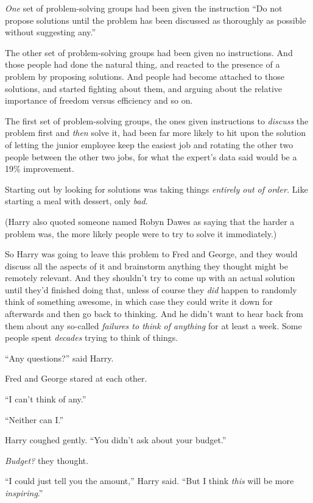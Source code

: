 \emph{One} set of problem-solving groups had been given the instruction “Do not propose solutions until the problem has been discussed as thoroughly as possible without suggesting any.”

The other set of problem-solving groups had been given no instructions. And those people had done the natural thing, and reacted to the presence of a problem by proposing solutions. And people had become attached to those solutions, and started fighting about them, and arguing about the relative importance of freedom versus efficiency and so on.

The first set of problem-solving groups, the ones given instructions to \emph{discuss} the problem first and \emph{then} solve it, had been far more likely to hit upon the solution of letting the junior employee keep the easiest job and rotating the other two people between the other two jobs, for what the expert’s data said would be a 19\% improvement.

Starting out by looking for solutions was taking things \emph{entirely out of order.} Like starting a meal with dessert, only \emph{bad}.

(Harry also quoted someone named Robyn Dawes as saying that the harder a problem was, the more likely people were to try to solve it immediately.)

So Harry was going to leave this problem to Fred and George, and they would discuss all the aspects of it and brainstorm anything they thought might be remotely relevant. And they shouldn’t try to come up with an actual solution until they’d finished doing that, unless of course they \emph{did} happen to randomly think of something awesome, in which case they could write it down for afterwards and then go back to thinking. And he didn’t want to hear back from them about any so-called \emph{failures to think of anything} for at least a week. Some people spent \emph{decades} trying to think of things.

“Any questions?” said Harry.

Fred and George stared at each other.

“I can’t think of any.”

“Neither can I.”

Harry coughed gently. “You didn’t ask about your budget.”

\emph{Budget?} they thought.

“I could just tell you the amount,” Harry said. “But I think \emph{this} will be more \emph{inspiring}.”

